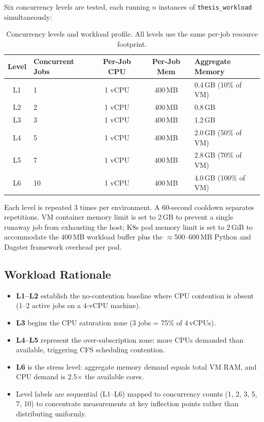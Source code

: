 Six concurrency levels are tested, each running $n$ instances of \texttt{thesis\_workload} simultaneously:

\begin{table}[H]
  \centering
  \caption{Concurrency levels and workload profile. All levels use the same per-job resource footprint.}
  \label{tab:workloads}
  \small
  \begin{tabularx}{\textwidth}{clccX}
    \toprule
    \textbf{Level} & \textbf{Concurrent Jobs} & \textbf{Per-Job CPU} & \textbf{Per-Job Mem} & \textbf{Aggregate Memory} \\
    \midrule
    L1  & 1  & 1 vCPU & 400\,MB & 0.4\,GB (10\% of VM) \\
    L2  & 2  & 1 vCPU & 400\,MB & 0.8\,GB \\
    L3  & 3  & 1 vCPU & 400\,MB & 1.2\,GB \\
    L4  & 5  & 1 vCPU & 400\,MB & 2.0\,GB (50\% of VM) \\
    L5  & 7  & 1 vCPU & 400\,MB & 2.8\,GB (70\% of VM) \\
    L6  & 10 & 1 vCPU & 400\,MB & 4.0\,GB (100\% of VM) \\
    \bottomrule
  \end{tabularx}
\end{table}

Each level is repeated 3 times per environment. A 60-second cooldown separates repetitions.
VM container memory limit is set to 2\,GB to prevent a single runaway job from exhausting the host; K8s pod memory limit is set to 2\,GiB to accommodate the 400\,MB workload buffer plus the $\approx$500--600\,MB Python and Dagster framework overhead per pod.

\subsection{Workload Rationale}
\label{subsec:workload-rationale}

\begin{itemize}
  \item \textbf{L1--L2} establish the no-contention baseline where CPU contention is absent (1--2 active jobs on a 4-vCPU machine).
  \item \textbf{L3} begins the CPU saturation zone (3 jobs = 75\% of 4\,vCPUs).
  \item \textbf{L4--L5} represent the over-subscription zone: more CPUs demanded than available, triggering CFS scheduling contention.
  \item \textbf{L6} is the stress level: aggregate memory demand equals total VM RAM, and CPU demand is 2.5$\times$ the available cores.
  \item Level labels are sequential (L1--L6) mapped to concurrency counts (1, 2, 3, 5, 7, 10) to concentrate measurements at key inflection points rather than distributing uniformly.
\end{itemize}
